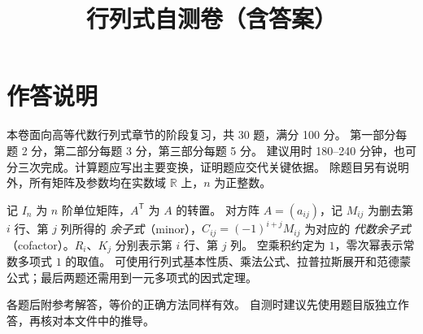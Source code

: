 \documentclass[UTF8,12pt,a4paper,fontset=fandol]{ctexart}
\title{行列式自测卷（含答案）}
\author{}
\date{}
\begin{document}
\maketitle

\section*{作答说明}
本卷面向高等代数行列式章节的阶段复习，共 30 题，满分 100 分。
第一部分每题 2 分，第二部分每题 3 分，第三部分每题 5 分。
建议用时 180--240 分钟，也可分三次完成。计算题应写出主要变换，证明题应交代关键依据。
除题目另有说明外，所有矩阵及参数均在实数域 $\mathbb R$ 上，$n$ 为正整数。

记 $I_n$ 为 $n$ 阶单位矩阵，$A^{\mathsf T}$ 为 $A$ 的转置。
对方阵 $A=(a_{ij})$，记 $M_{ij}$ 为删去第 $i$ 行、第 $j$ 列所得的
\emph{余子式}（minor），$C_{ij}=(-1)^{i+j}M_{ij}$ 为对应的
\emph{代数余子式}（cofactor）。$R_i$、$K_j$ 分别表示第 $i$ 行、第 $j$ 列。
空乘积约定为 $1$，零次幂表示常数多项式 $1$ 的取值。
可使用行列式基本性质、乘法公式、拉普拉斯展开和范德蒙公式；最后两题还需用到一元多项式的因式定理。

各题后附参考解答，等价的正确方法同样有效。
自测时建议先使用题目版独立作答，再核对本文件中的推导。
\end{document}
